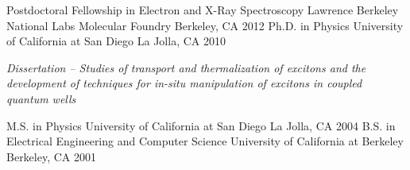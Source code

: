 \begin{cventries}
  \cventry
    {Postdoctoral Fellowship in Electron and X-Ray Spectroscopy}
    {Lawrence Berkeley National Labs Molecular Foundry}
    {Berkeley, CA}
    {2012}
    {}
  \cventry
    {Ph.D. in Physics}
    {University of California at San Diego}
    {La Jolla, CA}
    {2010}
    {
     \begin{cvitems}
        \emph{Dissertation -- Studies of transport and thermalization of excitons and the development of techniques for in-situ manipulation of excitons in coupled quantum wells}
      \end{cvitems}
    }
  \cventry
    {M.S. in Physics}
    {University of California at San Diego}
    {La Jolla, CA}
    {2004}
    {}
  \cventry
    {B.S. in Electrical Engineering and Computer Science}
    {University of California at Berkeley}
    {Berkeley, CA}
    {2001}
    {}
\end{cventries}
